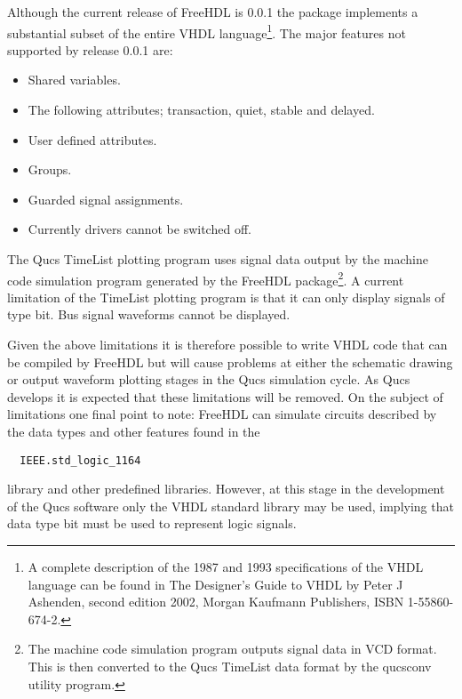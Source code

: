\addvspace{12pt}

Although the current release of FreeHDL is 0.0.1 the package
implements a substantial subset of the entire VHDL language\footnote{A
complete description of the 1987 and 1993 specifications of the VHDL
language can be found in The Designer's Guide to VHDL by Peter J
Ashenden, second edition 2002, Morgan Kaufmann Publishers, ISBN
1-55860-674-2. }.  The major features not supported by release 0.0.1
are:
\begin{itemize}
\item Shared variables.
\item The following attributes; transaction, quiet, stable and delayed.
\item User defined attributes.
\item Groups.
\item Guarded signal assignments.
\item Currently drivers cannot be switched off.
\end{itemize}

The Qucs TimeList plotting program uses signal data output by the
machine code simulation program generated by the FreeHDL
package\footnote{The machine code simulation program outputs signal
data in VCD format.  This is then converted to the Qucs TimeList data
format by the qucsconv utility program.}.  A current limitation of the
TimeList plotting program is that it can only display signals of type
bit. Bus signal waveforms cannot be displayed.

\addvspace{12pt}

Given the above limitations it is therefore possible to write VHDL
code that can be compiled by FreeHDL but will cause problems at either
the schematic drawing or output waveform plotting stages in the Qucs
simulation cycle.  As Qucs develops it is expected that these
limitations will be removed.  On the subject of limitations one final
point to note: FreeHDL can simulate circuits described by the data
types and other features found in the
\begin{verbatim}
  IEEE.std_logic_1164
\end{verbatim} 
library and other predefined libraries.  However, at this stage in the
development of the Qucs software only the VHDL standard library may be
used, implying that data type bit must be used to represent logic
signals.


